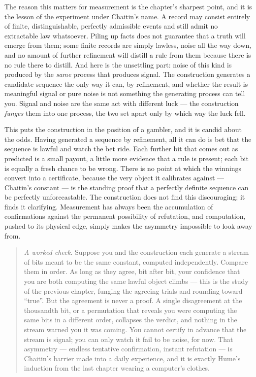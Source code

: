 The reason this matters for measurement is the chapter's sharpest point, and it is the lesson of the
experiment under Chaitin's name. A record may consist entirely of finite, distinguishable, perfectly
admissible events and still admit no extractable law whatsoever. Piling up facts does not guarantee
that a truth will emerge from them; some finite records are simply lawless, noise all the way down,
and no amount of further refinement will distill a rule from them because there is no rule there to
distill. And here is the unsettling part: noise of this kind is produced by the \emph{same} process
that produces signal. The construction generates a candidate sequence the only way it can, by
refinement, and whether the result is meaningful signal or pure noise is not something the generating
process can tell you. Signal and noise are the same act with different luck --- the construction \emph{funges} them into one
process, the two set apart only by which way the luck fell.

This puts the construction in the position of a gambler, and it is candid about the odds. Having
generated a sequence by refinement, all it can do is bet that the sequence is lawful and watch the bet
ride. Each further bit that comes out as predicted is a small payout, a little more evidence that a
rule is present; each bit is equally a fresh chance to be wrong. There is no point at which the
winnings convert into a certificate, because the very object it calibrates against --- Chaitin's
constant --- is the standing proof that a perfectly definite sequence can be perfectly unforecastable.
The construction does not find this discouraging; it finds it clarifying. Measurement has always been
the accumulation of confirmations against the permanent possibility of refutation, and computation,
pushed to its physical edge, simply makes the asymmetry impossible to look away from.

\begin{quote}
\emph{A worked check.} Suppose you and the construction each generate a stream of bits meant to be
the same constant, computed independently. Compare them in order. As long as they agree, bit after
bit, your confidence that you are both computing the same lawful object climbs --- this is the study
of the previous chapter, funging the agreeing trials and rounding toward ``true''. But the agreement is
never a proof. A single disagreement at the thousandth bit, or a permutation that reveals you were
computing the same bits in a different order, collapses the verdict, and nothing in the stream warned
you it was coming. You cannot certify in advance that the stream is signal; you can only watch it fail
to be noise, for now. That asymmetry --- endless tentative confirmation, instant refutation --- is
Chaitin's barrier made into a daily experience, and it is exactly Hume's induction from the last
chapter wearing a computer's clothes.
\end{quote}

